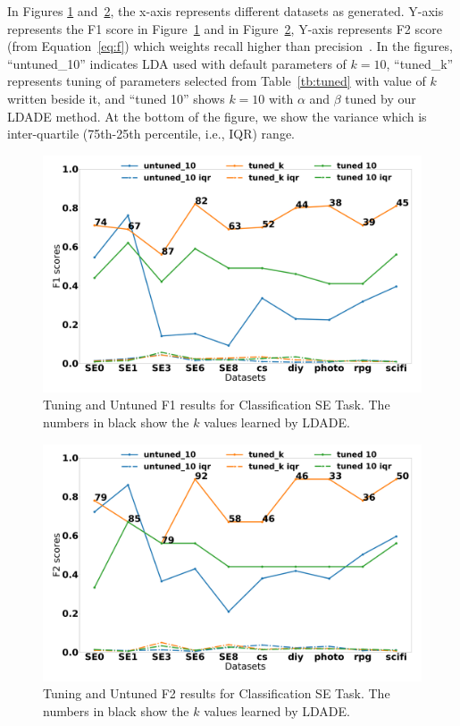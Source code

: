 \documentclass[twocolumn,5p,sort&compress]{elsarticle}
\newcommand{\eq}[1]{Equation~\ref{eq:#1}}
\theoremstyle{break}
\begin{document}
In Figures \ref{fig:classF1} and~\ref{fig:classF2}, the x-axis represents different datasets as generated. Y-axis represents the F1 score in Figure~\ref{fig:classF1} and in Figure~\ref{fig:classF2}, Y-axis represents F2 score
(from \eq{f})  which weights recall higher than precision~\cite{powers2011evaluation}. In the figures, ``untuned\_10'' indicates LDA used with default parameters of $k=10$, ``tuned\_k'' represents tuning of parameters selected from Table~\ref{tb:tuned} with value of $k$ written beside it, and ``tuned 10'' shows $k=10$ with $\alpha$ and $\beta$ tuned by our LDADE method. At the bottom of the figure, we show the variance which is inter-quartile (75th-25th percentile, i.e., IQR) range.

\begin{figure}[!htbp]
  \begin{center}
    \includegraphics[width=\linewidth]{./fig/F1_temp.png}
    \end{center}
  \caption{Tuning and Untuned F1 results for Classification SE Task. The numbers in black show the $k$ values
  learned by LDADE.}\label{fig:classF1}  
\end{figure}

\begin{figure}[!htbp]
  \begin{center}
    \includegraphics[width=\linewidth]{./fig/F2_temp.png}
    \end{center}
  \caption{Tuning and Untuned F2 results for Classification SE Task. The numbers in black show the $k$ values
  learned by LDADE.}\label{fig:classF2}  
\end{figure}
\end{document}
